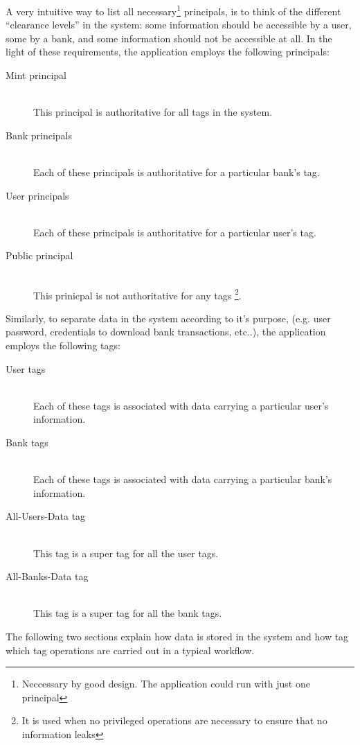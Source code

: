 A very intuitive way to list all necessary\footnote{Neccessary by good design. The application could run with just one principal} principals, is to think of the different ``clearance levels'' in the system: some information should be accessible by a user, some by a bank, and some information should not be accessible at all. In the light of these requirements, the application employs the following principals:
\begin{description}
  \item[Mint principal] \ \\
    This principal is authoritative for all tags in the system.
  \item[Bank principals] \ \\
    Each of these principals is authoritative for a particular bank's tag.
  \item[User principals] \ \\
    Each of these principals is authoritative for a particular user's tag.
  \item[Public principal] \ \\
    This prinicpal is not authoritative for any tags 
    \footnote{It is used when no privileged operations 
      are necessary to ensure that no information leaks}.
\end{description}

Similarly, to separate data in the system according to it's purpose, (e.g. user password, credentials to download bank transactions, etc..), the application employs the following tags:
\begin{description}
  \item[User tags] \ \\
    Each of these tags is associated with data 
    carrying a particular user's information.
  \item[Bank tags] \ \\
    Each of these tags is associated 
    with data carrying a particular bank's information.
  \item[All-Users-Data tag] \ \\ 
    This tag is a super tag for all the user 
    tags.
  \item[All-Banks-Data tag] \ \\ 
    This tag is a super tag for all the bank tags.
\end{description}

The following two sections explain how data is stored in the system and how tag which tag operations are carried out in a typical workflow.

